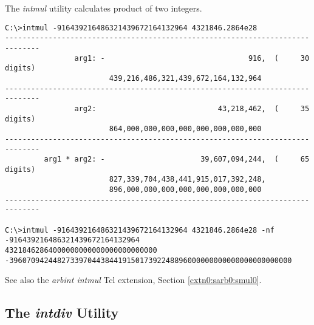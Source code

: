 \begin{dosutilcommandsynopsis}
\end{dosutilcommandsynopsis}

\begin{dosutilcommanddescription}
The \emph{intmul} utility calculates product of two 
integers.
\end{dosutilcommanddescription}


\begin{dosutilcommandsampleinvocations}
\begin{scriptsize}
\begin{verbatim}
C:\>intmul -916439216486321439672164132964 4321846.2864e28
------------------------------------------------------------------------------
                arg1: -                                 916,  (     30 digits)
                        439,216,486,321,439,672,164,132,964
------------------------------------------------------------------------------
                arg2:                            43,218,462,  (     35 digits)
                        864,000,000,000,000,000,000,000,000
------------------------------------------------------------------------------
         arg1 * arg2: -                      39,607,094,244,  (     65 digits)
                        827,339,704,438,441,915,017,392,248,
                        896,000,000,000,000,000,000,000,000
------------------------------------------------------------------------------

C:\>intmul -916439216486321439672164132964 4321846.2864e28 -nf
-916439216486321439672164132964
43218462864000000000000000000000000
-39607094244827339704438441915017392248896000000000000000000000000
\end{verbatim}
\end{scriptsize}
\end{dosutilcommandsampleinvocations}

\begin{dosutilcommandseealso}
See also the \emph{arbint intmul} Tcl extension, 
Section \ref{cxtn0:sarb0:smul0}.
\end{dosutilcommandseealso}

\subsection{The \emph{intdiv} Utility}
\label{cdcm0:sali0:sdiv0}

